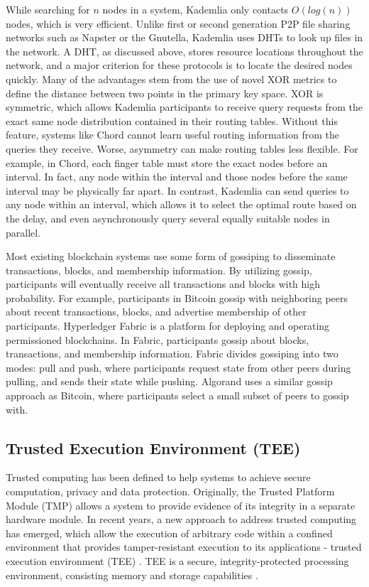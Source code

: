 While searching for $n$ nodes in a system, Kademlia only contacts $O(log(n))$ nodes, which is very efficient. Unlike first or second generation P2P file sharing networks such as Napster\cite{saroiu2001measurement} or the Gnutella\cite{ripeanu2001peer}, Kademlia uses DHTs to look up files in the network. A DHT, as discussed above, stores resource locations throughout the network, and a major criterion for these protocols is to locate the desired nodes quickly. Many of the advantages stem from the use of novel XOR metrics to define the distance between two points in the primary key space. XOR is symmetric, which allows Kademlia participants to receive query requests from the exact same node distribution contained in their routing tables. Without this feature, systems like Chord cannot learn useful routing information from the queries they receive. Worse, asymmetry can make routing tables less flexible. For example, in Chord, each finger table must store the exact nodes before an interval. In fact, any node within the interval and those nodes before the same interval may be physically far apart. In contrast, Kademlia can send queries to any node within an interval, which allows it to select the optimal route based on the delay, and even asynchronously query several equally suitable nodes in parallel.

Most existing blockchain systems use some form of gossiping to disseminate transactions, blocks, and membership information. By utilizing gossip, participants will eventually receive all transactions and blocks with high probability. For example, participants in Bitcoin \cite{nakamoto2008bitcoin} gossip with neighboring peers about recent transactions, blocks, and advertise membership of other participants. Hyperledger Fabric \cite{androulaki2018hyperledger} is a platform for deploying and operating permissioned blockchains. In Fabric, participants gossip about blocks, transactions, and membership information. Fabric divides gossiping into two modes: pull and push, where participants request state from other peers during pulling, and sends their state while pushing. Algorand \cite{gilad2017algorand} uses a similar gossip approach as Bitcoin, where participants select a small subset of peers to gossip with.

\subsection{Trusted Execution Environment (TEE)}

Trusted computing has been defined to help systems to achieve secure computation, privacy and data protection. Originally, the Trusted Platform Module (TMP) allows a system to provide evidence of its integrity in a separate hardware module. In recent years, a new approach to address trusted computing has emerged, which allow the execution of arbitrary code within a confined environment that provides tamper-resistant execution to its applications - trusted execution environment (TEE) \cite{sabt2015trusted}. TEE is a secure, integrity-protected processing environment, consisting memory and storage capabilities \cite{asokan2014mobile}.

